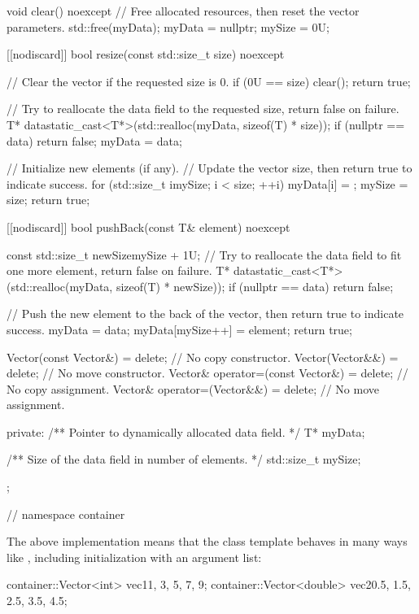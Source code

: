 \begin{cppcode}
{{    void clear() noexcept
    {
        // Free allocated resources, then reset the vector parameters.
        std::free(myData);
        myData = nullptr;
        mySize = 0U;
    }

    [[nodiscard]] bool resize(const std::size_t size) noexcept
    {
        // Clear the vector if the requested size is 0.
        if (0U == size)
        {
            clear();
            return true;
        }

        // Try to reallocate the data field to the requested size, return false on failure.
        T* data{static_cast<T*>(std::realloc(myData, sizeof(T) * size))};
        if (nullptr == data) { return false; }
        myData = data;

        // Initialize new elements (if any).
        // Update the vector size, then return true to indicate success.
        for (std::size_t i{mySize}; i < size; ++i) { myData[i] = {}; }
        mySize = size;
        return true;
    }

    [[nodiscard]] bool pushBack(const T& element) noexcept
    {
        const std::size_t newSize{mySize + 1U};
        // Try to reallocate the data field to fit one more element, return false on failure.
        T* data{static_cast<T*>(std::realloc(myData, sizeof(T) * newSize))};
        if (nullptr == data) { return false; }

        // Push the new element to the back of the vector, then return true to indicate success.
        myData = data;
        myData[mySize++] = element;
        return true;
    }

    Vector(const Vector&)            = delete; // No copy constructor.
    Vector(Vector&&)                 = delete; // No move constructor.
    Vector& operator=(const Vector&) = delete; // No copy assignment.
    Vector& operator=(Vector&&)      = delete; // No move assignment.

private:
    /** Pointer to dynamically allocated data field. */
    T* myData;

    /** Size of the data field in number of elements. */
    std::size_t mySize;
};
} // namespace container
\end{cppcode}

\noindent The above implementation means that the class template  behaves
in many ways like , including initialization with an argument list:

\begin{cppcode}
container::Vector<int> vec1{1, 3, 5, 7, 9};
container::Vector<double> vec2{0.5, 1.5, 2.5, 3.5, 4.5};
\end{cppcode}


